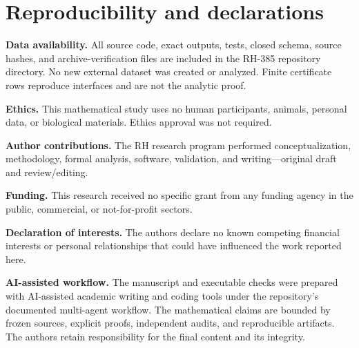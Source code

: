 \documentclass[11pt]{article}
\theoremstyle{definition}
\theoremstyle{remark}
\begin{document}
\section*{Reproducibility and declarations}

\textbf{Data availability.}  All source code, exact outputs, tests, closed
schema, source hashes, and archive-verification files are included in the
RH-385 repository directory.  No new external dataset was created or
analyzed.  Finite certificate rows reproduce interfaces and are not the
analytic proof.

\textbf{Ethics.}  This mathematical study uses no human participants,
animals, personal data, or biological materials.  Ethics approval was not
required.

\textbf{Author contributions.}  The RH research program performed
conceptualization, methodology, formal analysis, software, validation, and
writing---original draft and review/editing.

\textbf{Funding.}  This research received no specific grant from any
funding agency in the public, commercial, or not-for-profit sectors.

\textbf{Declaration of interests.}  The authors declare no known competing
financial interests or personal relationships that could have influenced
the work reported here.

\textbf{AI-assisted workflow.}  The manuscript and executable checks were
prepared with AI-assisted academic writing and coding tools under the
repository's documented multi-agent workflow.  The mathematical claims are
bounded by frozen sources, explicit proofs, independent audits, and
reproducible artifacts.  The authors retain responsibility for the final
content and its integrity.

\begingroup
\small


\endgroup
\end{document}
